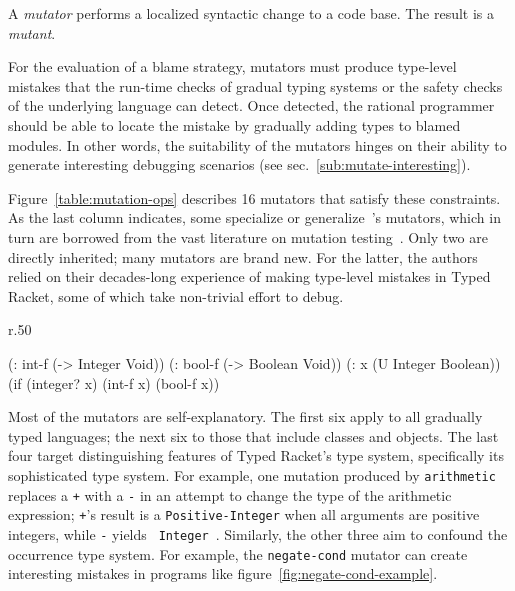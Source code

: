 
A {\it mutator\/} performs a localized syntactic change to a code base. The
result is a {\em mutant\/}.

For the evaluation of a blame strategy, mutators must produce type-level
mistakes that the run-time checks of gradual typing systems or the safety
checks of the underlying language can detect. Once detected, the rational
programmer should be able to locate the mistake by gradually adding types
to blamed modules. In other words, the suitability of the mutators hinges
on their ability to generate interesting debugging scenarios (see
sec.~\ref{sub:mutate-interesting}).


Figure~\ref{table:mutation-ops} describes 16 mutators that satisfy these
constraints. As the last column indicates, some specialize or
generalize~\citet{lksfd-popl-2020}'s mutators, which in turn are borrowed from
the vast literature on mutation testing~\citep{jia2011analysis}.  Only two are
directly inherited; many mutators are brand new. For the latter, the authors
relied on their decades-long experience of making type-level mistakes in Typed
Racket, some of which take non-trivial effort to debug.

\begin{wrapfigure}{r}{.50\textwidth} \footnotesize
\hspace{0.2cm}
\begin{module}{}\typecolor
(: int-f  (-> Integer Void))
(: bool-f (-> Boolean Void))
(: x      (U Integer Boolean))
(if (integer? x)
  (int-f x)
  (bool-f x))
\end{module}
\caption{Example program using occurrence typing}
\label{fig:negate-cond-example}
\end{wrapfigure}

Most of the mutators are self-explanatory.  The first six apply to all
gradually typed languages; the next six to those that include classes and
objects. The last four target distinguishing features of Typed
Racket's type system,
specifically its sophisticated type system. For example, one mutation produced by {\tt arithmetic}
replaces a {\tt +} with a {\tt -} in an attempt to change the type of the
arithmetic expression; {\tt +}'s result is a {\tt Positive-Integer} when all
arguments are positive integers, while {\tt -} yields {\tt
Integer}~\citep{stathff-padl-12}. Similarly, the other three aim to confound
the occurrence type system. For example, the {\tt negate-cond} mutator can
create interesting mistakes in programs like figure~\ref{fig:negate-cond-example}.

